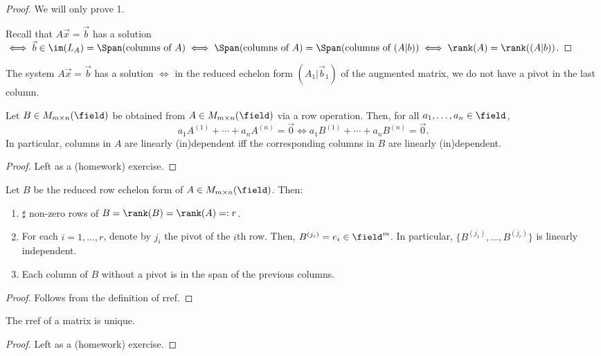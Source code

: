 \begin{proof}
    We will only prove 1.

    Recall that $A \vec{x} = \vec{b}$ has a solution $\iff \vec{b} \in \im(L_A) = \Span(\text{columns of } A) \iff  \Span(\text{columns of } A) = \Span(\text{columns of } (A \vert b)) \iff \rank(A) = \rank((A \vert b))$.
\end{proof}

\begin{corollary}
    The system $A \vec{x} = \vec{b}$ has a solution $\iff$ in the reduced echelon form $(A_1\vert \vec{b}_1)$ of the augmented matrix, we do not have a pivot in the last column.
\end{corollary}

\begin{lemma}\label{lemma:elementarypreservationofdependence}
    Let $B \in M_{m \times n}(\field)$ be obtained from $A \in M_{m \times n}(\field)$ via a row operation. Then, for all $a_1, \dots, a_n \in \field$, $$a_1 A^{(1)} + \cdots + a_n A^{(n)} = \vec{0} \iff a_1 B^{(1)} + \cdots + a_n B^{(n)} = \vec{0}.$$
    In particular, columns in $A$ are linearly (in)dependent iff the corresponding columns in $B$ are linearly (in)dependent.
\end{lemma}
\begin{proof}
    Left as a (homework) exercise.
\end{proof}

\begin{lemma}
    Let $B$ be the reduced row echelon form of $A \in M_{m \times n}(\field)$. Then:
    \begin{enumerate}
        \item $\sharp$ non-zero rows of $B= \rank(B) = \rank(A) =: r$.
        \item For each $i = 1, \dots, r$, denote by $j_i$ the pivot of the $i$th row. Then, $B^{(j_i)} = e_i \in \field^m$. In particular, $\{B^{(j_1)}, \dots, B^{(j_r)}\}$ is linearly independent.
        \item Each column of $B$ without a pivot is in the span of the previous columns.
    \end{enumerate}
\end{lemma}
\begin{proof}
   Follows from the definition of rref.
\end{proof}

\begin{corollary}
    The rref of a matrix is unique.
\end{corollary}
\begin{proof}
    Left as a (homework) exercise.
\end{proof}
